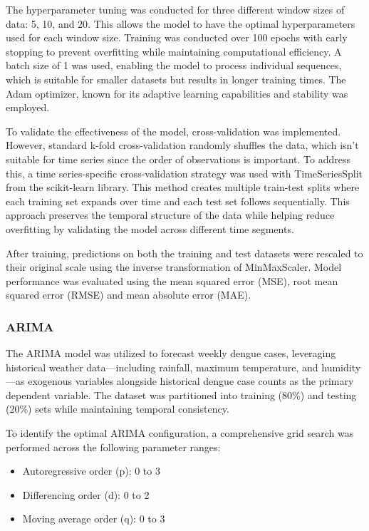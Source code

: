 The hyperparameter tuning was conducted for three different window sizes of data: 5, 10, and 20. This allows the model to have the optimal hyperparameters used for each window size. Training was conducted over 100 epochs with early stopping to prevent overfitting while maintaining computational efficiency. A batch size of 1 was used, enabling the model to process individual sequences, which is suitable for smaller datasets but results in longer training times. The Adam optimizer, known for its adaptive learning capabilities and stability was employed.

To validate the effectiveness of the model, cross-validation was implemented. However, standard k-fold cross-validation randomly shuffles the data, which isn't suitable for time series since the order of observations is important. To address this, a time series-specific cross-validation strategy was used with TimeSeriesSplit from the scikit-learn library. This method creates multiple train-test splits where each training set expands over time and each test set follows sequentially. This approach preserves the temporal structure of the data while helping reduce overfitting by validating the model across different time segments.

After training, predictions on both the training and test datasets were rescaled to their original scale using the inverse transformation of MinMaxScaler. Model performance was evaluated using the mean squared error (MSE), root mean squared error (RMSE) and mean absolute error (MAE).

\subsubsection{ARIMA}
The ARIMA model was utilized to forecast weekly dengue cases, leveraging historical weather data—including rainfall, maximum temperature, and humidity—as exogenous variables alongside historical dengue case counts as the primary dependent variable. The dataset was partitioned into training (80\%) and testing (20\%) sets while maintaining temporal consistency.

To identify the optimal ARIMA configuration, a comprehensive grid search was performed across the following parameter ranges:
\begin{itemize} \item Autoregressive order (p): 0 to 3 \item Differencing order (d): 0 to 2 \item Moving average order (q): 0 to 3 \end{itemize}

